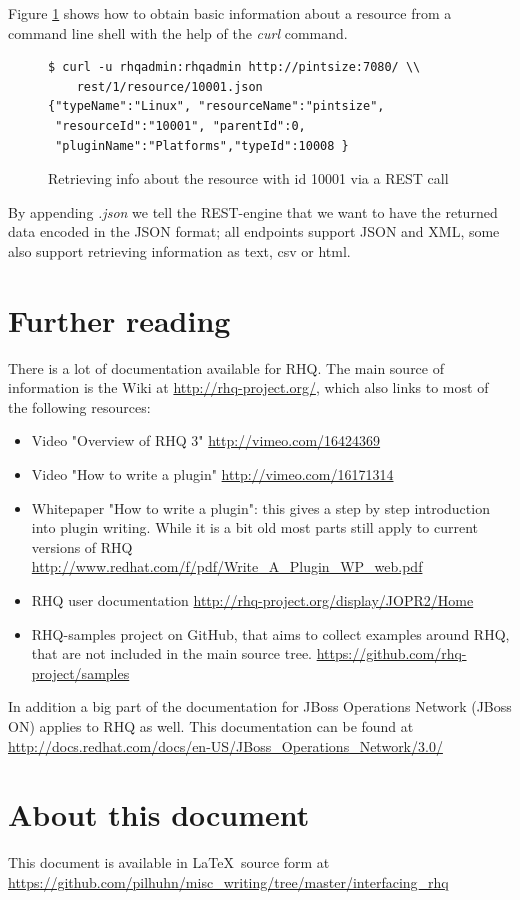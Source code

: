 \documentclass[twocolumn,10pt,a4paper]{article}
\begin{document}
Figure \ref{fig:rest} shows how to obtain basic information about a resource
from a command line shell with the help of the \emph{curl} command.

\begin{figure}[h]
{\scriptsize
\begin{verbatim}
$ curl -u rhqadmin:rhqadmin http://pintsize:7080/ \\
    rest/1/resource/10001.json
{"typeName":"Linux", "resourceName":"pintsize",
 "resourceId":"10001", "parentId":0,
 "pluginName":"Platforms","typeId":10008 }
\end{verbatim}
}
\caption{Retrieving info about the resource with id 10001 via a REST call}
\label{fig:rest}
\end{figure}

By appending \emph{.json} we tell the REST-engine that we want to have the returned data encoded in the JSON format; all endpoints support JSON and XML, some also support retrieving information as text, csv or html.

\section{Further reading}

There is a lot of documentation available for RHQ. The main source of information is the Wiki at \url{http://rhq-project.org/}, which also links to most of the following resources:

\begin{itemize}
\item Video "Overview of RHQ 3" \url{http://vimeo.com/16424369}
\item Video "How to write a plugin" \url{http://vimeo.com/16171314}
\item Whitepaper "How to write a plugin": this gives a step by step introduction into plugin writing. While it is a bit old most parts still apply to current versions of RHQ \url{http://www.redhat.com/f/pdf/Write_A_Plugin_WP_web.pdf}
\item RHQ user documentation \url{http://rhq-project.org/display/JOPR2/Home}
\item RHQ-samples project on GitHub, that aims to collect examples around RHQ, that are not included in the main source tree. \url{https://github.com/rhq-project/samples}
\end{itemize}

In addition a big part of the documentation for JBoss Operations Network (JBoss ON) applies to RHQ as well. This documentation can be found at \url{http://docs.redhat.com/docs/en-US/JBoss_Operations_Network/3.0/}

\section*{About this document}
This document is available in \LaTeX\ source form at \url{https://github.com/pilhuhn/misc_writing/tree/master/interfacing_rhq}
\end{document}
